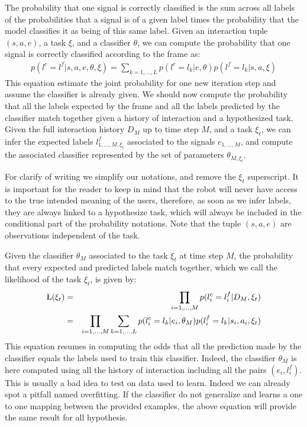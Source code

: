 The probability that one signal is correctly classified is the sum across all labels of the probabilities that a signal is of a given label times the probability that the model classifies it as being of this same label. Given an interaction tuple $(s,a,e)$, a task $\xi$, and a classifier $\theta$, we can compute the probability that one signal is correctly classified according to the frame as:
%
\begin{eqnarray}
p(l^c = l^f | s, a, e, \theta, \xi) = \sum_{k = 1, \ldots, L} p(l^c = l_k | e, \theta) p(l^f = l_k | s, a, \xi)
\end{eqnarray}
%
This equation estimate the joint probability for one new iteration step and assume the classifier is already given.  We should now compute the probability that all the labels expected by the frame and all the labels predicted by the classifier match together given a history of interaction and a hypothesized task. Given the full interaction history $D_M$ up to time step $M$, and a task $\xi_t$, we can infer the expected labels $l^f_{1,\ldots,M, \xi_t}$ associated to the signals $e_{1,\ldots,M}$, and compute the associated classifier represented by the set of parameters $\theta_{M, \xi_t}$. 

For clarify of writing we simplify our notations, and remove the $\xi_t$ superscript. It is important for the reader to keep in mind that the robot will never have access to the true intended meaning of the users, therefore, as soon as we infer labels, they are always linked to a hypothesize task, which will always be included in the conditional part of the probability notations. Note that the tuple $(s, a, e)$ are observations independent of the task.

Given the classifier $\theta_M$ associated to the task $\xi_t$ at time step $M$, the probability that every expected and predicted labels match together, which we call the likelihood of the task $\xi_t$, is given by:
%
\begin{eqnarray}
\L(\xi_t) &=& \prod_{i = 1,\ldots,M} p(l^c_i = l^f_i | D_M, \xi_t) \nonumber \\ 
&=& \prod_{i = 1,\ldots,M} \sum_{k = 1, \ldots, L} p(l^c_i = l_k | e_i, \theta_M) p(l^f_i = l_k | s_i, a_i, \xi_t)
\label{eq:matchingoverfitting} 
\end{eqnarray}
%
This equation resumes in computing the odds that all the prediction made by the classifier equals the labels used to train this classifier. Indeed, the classifier $\theta_{M}$ is here computed using all the history of interaction including all the pairs $(e_i, l^f_i)$. This is usually a bad idea to test on data used to learn. Indeed we can already spot a pitfall named overfitting. If the classifier do not generalize and learns a one to one mapping between the provided examples, the above equation will provide the same result for all hypothesis. 

